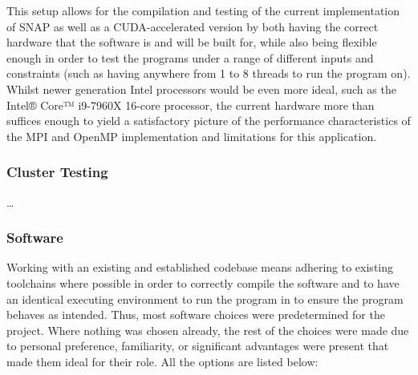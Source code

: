 \documentclass[conference]{IEEEtran}
\begin{document}
This setup allows for the compilation and testing of the current implementation of SNAP as well as a CUDA-accelerated version by both having the correct hardware that the software is and will be built for, while also being flexible enough in order to test the programs under a range of different inputs and constraints (such as having anywhere from 1 to 8 threads to run the program on). Whilst newer generation Intel processors would be even more ideal, such as the Intel® Core™ i9-7960X 16-core processor, the current hardware more than suffices enough to yield a satisfactory picture of the performance characteristics of the MPI and OpenMP implementation and limitations for this application.

\subsubsection{Cluster Testing}

\dots

\subsubsection{Software}

Working with an existing and established codebase means adhering to existing toolchains where possible in order to correctly compile the software and to have an identical executing environment to run the program in to ensure the program behaves as intended. Thus, most software choices were predetermined for the project. Where nothing was chosen already, the rest of the choices were made due to personal preference, familiarity, or significant advantages were present that made them ideal for their role. All the options are listed below:
\end{document}
